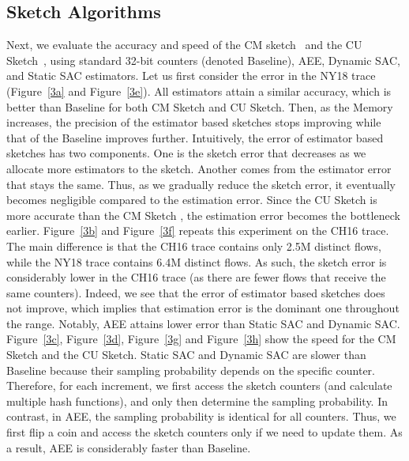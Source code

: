 \subsection{Sketch Algorithms}
Next, we evaluate the accuracy and speed of the CM sketch~\cite{CountMinSketch} and the CU Sketch~\cite{CUSketch}, using standard 32-bit counters (denoted Baseline), AEE, Dynamic SAC, and Static SAC estimators. Let us first consider the error in the NY18 trace (Figure~\ref{3a} and Figure~\ref{3e}). 
All estimators attain a similar accuracy, which is better than Baseline for both CM Sketch and CU Sketch. Then, as the Memory increases, the precision of the estimator based sketches stops improving while that of the Baseline improves further. 
Intuitively, the error of estimator based sketches has two components. 
One is the sketch error that decreases as we allocate more estimators to the sketch. Another comes from the estimator error that stays the same. Thus, as we gradually reduce the sketch error, it eventually becomes negligible compared to the estimation error. Since the CU Sketch is more accurate than the CM Sketch \cite{CUSketch}, the estimation error becomes the bottleneck earlier. Figure~\ref{3b} and Figure~\ref{3f} repeats this experiment on the CH16 trace.  
The main difference is that the CH16 trace contains only 2.5M distinct flows, while the NY18 trace contains 6.4M distinct flows. As such, the sketch error is considerably lower in the CH16 trace (as there are fewer flows that receive the same counters). Indeed, we see that the error of estimator based sketches does not improve, which implies that estimation error is the dominant one throughout the range. Notably, AEE attains lower error than Static SAC and Dynamic SAC. Figure~\ref{3c}, Figure~\ref{3d}, Figure~\ref{3g} and Figure~\ref{3h} show the speed for the CM Sketch and the CU Sketch.  Static SAC and Dynamic SAC are slower than Baseline because their sampling probability depends on the specific counter. Therefore, for each increment, we first access the sketch counters (and calculate multiple hash functions), and only then determine the sampling probability.
In contrast, in AEE, the sampling probability is identical for all counters. Thus, we first flip a coin and access the sketch counters only if we need to update them. As a result, AEE is \mbox{considerably} faster than Baseline. %



